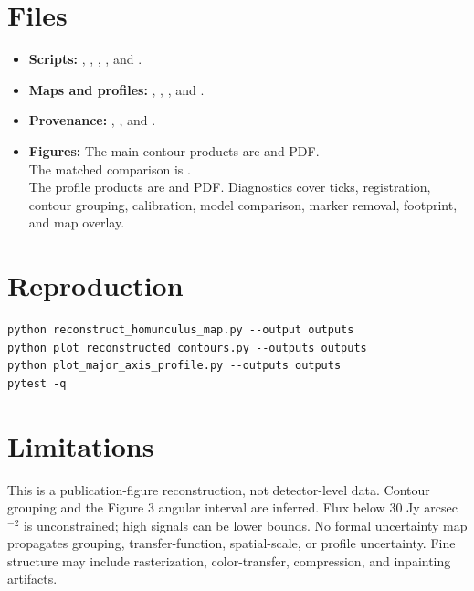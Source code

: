 \documentclass[11pt]{article}
\begin{document}
\section{Files}
\begin{itemize}
\item \textbf{Scripts:} , , , , and .
\item \textbf{Maps and profiles:} , , , and .
\item \textbf{Provenance:} , , and .
\item \textbf{Figures:} The main contour products are  and PDF.\\
The matched comparison is .\\
The profile products are  and PDF. Diagnostics cover ticks, registration, contour grouping, calibration, model comparison, marker removal, footprint, and map overlay.
\end{itemize}

\section{Reproduction}
\begin{verbatim}
python reconstruct_homunculus_map.py --output outputs
python plot_reconstructed_contours.py --outputs outputs
python plot_major_axis_profile.py --outputs outputs
pytest -q
\end{verbatim}

\section{Limitations}
This is a publication-figure reconstruction, not detector-level data. Contour grouping and the Figure 3 angular interval are inferred. Flux below 30 Jy arcsec$^{-2}$ is unconstrained; high signals can be lower bounds. No formal uncertainty map propagates grouping, transfer-function, spatial-scale, or profile uncertainty. Fine structure may include rasterization, color-transfer, compression, and inpainting artifacts.
\end{document}
